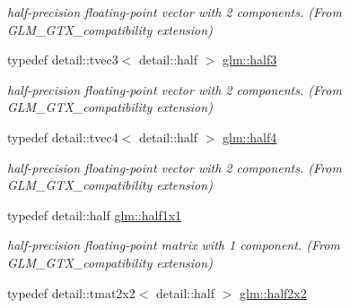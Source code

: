 \begin{DoxyCompactItemize}
\begin{DoxyCompactList}\small\item\em half-\/precision floating-\/point vector with 2 components. (From G\+L\+M\+\_\+\+G\+T\+X\+\_\+compatibility extension) \end{DoxyCompactList}\item 
\hypertarget{group__gtx__compatibility_ga0bd01279a508607e66785630424dd383}{}typedef detail\+::tvec3$<$ detail\+::half $>$ \hyperlink{group__gtx__compatibility_ga0bd01279a508607e66785630424dd383}{glm\+::half3}\label{group__gtx__compatibility_ga0bd01279a508607e66785630424dd383}

\begin{DoxyCompactList}\small\item\em half-\/precision floating-\/point vector with 2 components. (From G\+L\+M\+\_\+\+G\+T\+X\+\_\+compatibility extension) \end{DoxyCompactList}\item 
\hypertarget{group__gtx__compatibility_ga238562698fa4cda449562dab923d4c56}{}typedef detail\+::tvec4$<$ detail\+::half $>$ \hyperlink{group__gtx__compatibility_ga238562698fa4cda449562dab923d4c56}{glm\+::half4}\label{group__gtx__compatibility_ga238562698fa4cda449562dab923d4c56}

\begin{DoxyCompactList}\small\item\em half-\/precision floating-\/point vector with 2 components. (From G\+L\+M\+\_\+\+G\+T\+X\+\_\+compatibility extension) \end{DoxyCompactList}\item 
\hypertarget{group__gtx__compatibility_ga7ce07d3152f3355936a1d298e5fc7849}{}typedef detail\+::half \hyperlink{group__gtx__compatibility_ga7ce07d3152f3355936a1d298e5fc7849}{glm\+::half1x1}\label{group__gtx__compatibility_ga7ce07d3152f3355936a1d298e5fc7849}

\begin{DoxyCompactList}\small\item\em half-\/precision floating-\/point matrix with 1 component. (From G\+L\+M\+\_\+\+G\+T\+X\+\_\+compatibility extension) \end{DoxyCompactList}\item 
\hypertarget{group__gtx__compatibility_ga1f57598207fde1ab6b9d379b04abd094}{}typedef detail\+::tmat2x2$<$ detail\+::half $>$ \hyperlink{group__gtx__compatibility_ga1f57598207fde1ab6b9d379b04abd094}{glm\+::half2x2}\label{group__gtx__compatibility_ga1f57598207fde1ab6b9d379b04abd094}


\end{DoxyCompactItemize}
